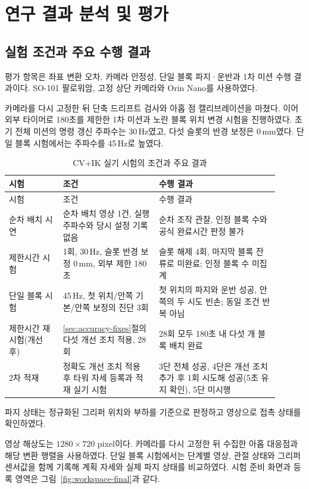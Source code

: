 \chapter{연구 결과 분석 및 평가}
\section{실험 조건과 주요 수행 결과}
평가 항목은 좌표 변환 오차, 카메라 안정성, 단일 블록 파지·운반과 1차 미션 수행 결과이다. SO-101 팔로워암, 고정 상단 카메라와 Orin Nano를 사용하였다.

카메라를 다시 고정한 뒤 단축 드리프트 검사와 아홉 점 캘리브레이션을 마쳤다. 이어 외부 타이머로 180초를 제한한 1차 미션과 노란 블록 위치 변경 시험을 진행하였다. 초기 전체 미션의 명령 갱신 주파수는 30\,Hz였고, 다섯 슬롯의 반경 보정은 0\,mm였다. 단일 블록 시험에서는 주파수를 45\,Hz로 높였다.

\begin{longtable}{@{}L{0.18\linewidth}L{0.32\linewidth}L{0.40\linewidth}@{}}
\caption{CV+IK 실기 시험의 조건과 주요 결과}\label{tab:eval-definitions}\\
\toprule 시험 & 조건 & 수행 결과 \\\midrule
\endfirsthead
\toprule 시험 & 조건 & 수행 결과 \\\midrule
\endhead
순차 배치 시연 & 순차 배치 영상 1건, 실행 주파수와 당시 설정 기록 없음 & 순차 조작 관찰, 인정 블록 수와 공식 완료시간 판정 불가 \\
제한시간 시험 & 1회, 30\,Hz, 슬롯 반경 보정 0\,mm, 외부 제한 180초 & 슬롯 해제 4회, 마지막 블록 잔류로 미완료; 인정 블록 수 미집계 \\
단일 블록 시험 & 45\,Hz, 첫 위치/안쪽 기본/안쪽 보정의 진단 3회 & 첫 위치의 파지와 운반 성공, 안쪽의 두 시도 빈손; 동일 조건 반복 아님 \\
제한시간 재시험(개선 후) & \ref{sec:accuracy-fixes}절의 다섯 개선 조치 적용, 28회 & 28회 모두 180초 내 다섯 개 블록 배치 완료 \\
2차 적재 & 정확도 개선 조치 적용 후 타워 자세 등록과 적재 실기 시험 & 3단 전체 성공, 4단은 개선 조치 추가 후 1회 시도해 성공(5초 유지 확인), 5단 미시행 \\
\bottomrule
\end{longtable}

파지 상태는 정규화된 그리퍼 위치와 부하를 기준으로 판정하고 영상으로 접촉 상태를 확인하였다.

영상 해상도는 $1280\times720$ pixel이다. 카메라를 다시 고정한 뒤 수집한 아홉 대응점과 해당 변환 행렬을 사용하였다. 단일 블록 시험에서는 단계별 영상, 관절 상태와 그리퍼 센서값을 함께 기록해 계획 자세와 실제 파지 상태를 비교하였다. 시험 준비 화면과 등록 영역은 그림~\ref{fig:workspace-final}과 같다.


